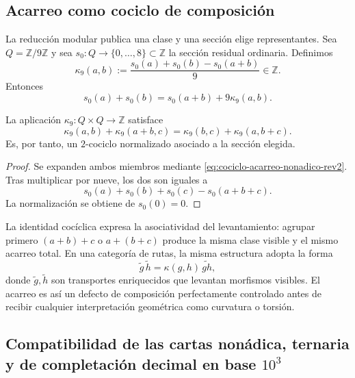 \subsection{Acarreo como cociclo de composición}

La reducción modular publica una clase y una sección elige representantes.
Sea \(Q=\mathbb Z/9\mathbb Z\) y sea
\(s_0:Q\to\{0,\ldots,8\}\subset\mathbb Z\) la sección residual ordinaria.
Definimos
\begin{equation}
 \kappa_9(a,b)
 :=\frac{s_0(a)+s_0(b)-s_0(a+b)}{9}\in\mathbb Z.
 \label{eq:cociclo-acarreo-nonadico-rev2}
\end{equation}
Entonces
\[
 s_0(a)+s_0(b)=s_0(a+b)+9\kappa_9(a,b).
\]

\begin{proposition}
\label{prop:acarreo-dos-cociclo-rev2}
La aplicación \(\kappa_9:Q\times Q\to\mathbb Z\) satisface
\begin{equation}
 \kappa_9(a,b)+\kappa_9(a+b,c)
 =\kappa_9(b,c)+\kappa_9(a,b+c).
 \label{eq:identidad-dos-cociclo-rev2}
\end{equation}
Es, por tanto, un \(2\)-cociclo normalizado asociado a la sección elegida.
\end{proposition}

\begin{proof}
Se expanden ambos miembros mediante
\eqref{eq:cociclo-acarreo-nonadico-rev2}. Tras multiplicar por nueve, los dos
son iguales a
\[
 s_0(a)+s_0(b)+s_0(c)-s_0(a+b+c).
\]
La normalización se obtiene de \(s_0(0)=0\).
\end{proof}

La identidad cocíclica expresa la asociatividad del levantamiento: agrupar primero
\((a+b)+c\) o \(a+(b+c)\) produce la misma clase visible y el mismo acarreo
total. En una categoría de rutas, la misma estructura adopta la forma
\[
 \widetilde g\,\widetilde h
 =\kappa(g,h)\,\widetilde{gh},
\]
donde \(\widetilde g,\widetilde h\) son transportes enriquecidos que levantan
morfismos visibles. El acarreo es así un defecto de composición perfectamente
controlado antes de recibir cualquier interpretación geométrica como
curvatura o torsión.

\subsection{Compatibilidad de las cartas nonádica, ternaria y de completación decimal en base \texorpdfstring{\(10^3\)}{10^3}}
\label{subsec:compatibilidad-lectores-9-3-1000-rev3}

